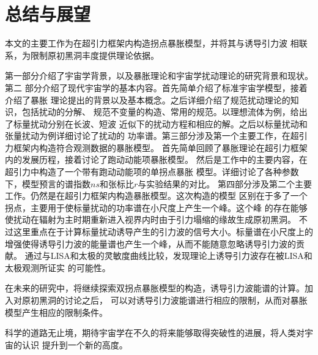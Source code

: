 \chapter{总结与展望}%
\label{chap:summary}
本文的主要工作为在超引力框架内构造拐点暴胀模型，并将其与诱导引力波
相联系，为限制原初黑洞丰度提供理论依据。

第一部分介绍了宇宙学背景，以及暴胀理论和宇宙学扰动理论的研究背景和现状。第二
部分介绍了现代宇宙学的基本内容。首先简单介绍了标准宇宙学模型，接着介绍了暴胀
理论提出的背景以及基本概念。之后详细介绍了规范扰动理论的知识，包括扰动的分解、
规范不变量的构造、常用的规范。以理想流体为例，给出了标量扰动分别在长波、短波
近似下的扰动方程和相应的解。之后以标量扰动和张量扰动为例详细讨论了扰动的
功率谱。第三部分涉及第一个主要工作，在超引力框架内构造符合观测数据的暴胀模型。
首先简单回顾了暴胀理论在超引力框架内的发展历程，接着讨论了跑动动能项暴胀模型。
然后是工作中的主要内容，在超引力中构造了一个带有跑动动能项的单拐点暴胀
模型。详细讨论了各种参数下，模型预言的谱指数$ns$和张标比$r$与实验结果的对比。
第四部分涉及第二个主要工作。仍然是在超引力框架内构造暴胀模型。这次构造的模型
区别在于多了一个拐点，主要用于使标量扰动的功率谱在小尺度上产生一个峰。这个峰
的存在能够使扰动在辐射为主时期重新进入视界内时由于引力塌缩的缘故生成原初黑洞。
不过这里重点在于计算标量扰动诱导产生的引力波的信号大小。标量谱在小尺度上的
增强使得诱导引力波的能量谱也产生一个峰，从而不能随意忽略诱导引力波的贡献。
通过与LISA和太极的灵敏度曲线比较，发现理论上诱导引力波存在被LISA和太极观测所证实
的可能性。

在未来的研究中，将继续探索双拐点暴胀模型的构造，诱导引力波能谱的计算。加入对原初黑洞的讨论之后，
可以对诱导引力波能谱进行相应的限制，从而对暴胀模型产生相应的限制条件。

科学的道路无止境，期待宇宙学在不久的将来能够取得突破性的进展，将人类对宇宙的认识
提升到一个新的高度。


